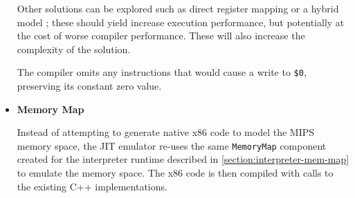 \begin{itemize}
    Other solutions can be explored such as direct register mapping or a hybrid model \cite{mark-probst-dbt}; these should yield increase execution performance, but potentially at the cost of worse compiler performance. These will also increase the complexity of the solution.

    The compiler omits any instructions that would cause a write to \texttt{\$0}, preserving its constant zero value.

    \item \textbf{Memory Map}

    Instead of attempting to generate native x86 code to model the MIPS memory space, the JIT emulator re-uses the same \texttt{MemoryMap} component created for the interpreter runtime described in \autoref{section:interpreter-mem-map} to emulate the memory space. The x86 code is then compiled with calls to the existing C++ implementations.
\end{itemize}
